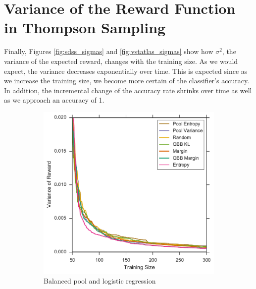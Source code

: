 \section{Variance of the Reward Function in Thompson Sampling}

Finally, Figures \ref{fig:sdss_sigmas} and \ref{fig:vstatlas_sigmas} show how $\sigma^2$,
the variance of the expected reward, changes with the training size. As we would expect,
the variance decreases exponentially over time. This is expected since as we increase
the training size, we become more certain of the classifier's accuracy. In addition, the incremental change
of the accuracy rate shrinks over time as well as we approach an accuracy of 1.

\begin{figure}[p]
	\centering
	\begin{subfigure}{.5\textwidth}
		\centering
		\includegraphics[width=\textwidth]{figures/5_thompson/vstatlas_bl_sigmas}
		\caption{Balanced pool and logistic regression}
		\label{fig:sdss_bl_sigmas}
	\end{subfigure}%
	\begin{subfigure}{.5\textwidth}
		\centering

\end{subfigure}
\end{figure}
